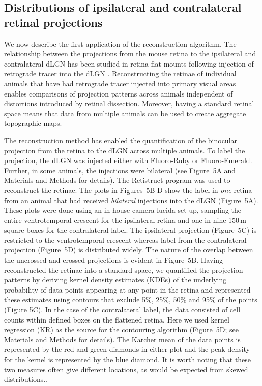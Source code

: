 \documentclass[10pt]{article}
\newcounter{Figure}
\begin{document}
\subsection*{Distributions of ipsilateral and contralateral retinal
projections }
We now describe the first application of the reconstruction algorithm.
The relationship between the projections from the mouse retina to the
ipsilateral and contralateral dLGN has been studied in retina
flat-mounts following injection of retrograde tracer into the dLGN \cite{ColemanEtal2009}. Reconstructing the retinae of individual
animals that have had retrograde tracer injected into primary visual
areas enables comparisons of projection patterns across animals
independent of distortions introduced by retinal dissection.
Moreover, having a standard retinal space means that data from
multiple animals can be used to create aggregate topographic maps. 

The reconstruction method has enabled the quantification of the
binocular projection from the retina to the dLGN across multiple
animals. To label the projection, the dLGN was injected either with
Fluoro-Ruby or Fluoro-Emerald. Further, in some animals, the
injections were bilateral (see Figure~5A and Materials and Methods
for details). The Retistruct program was used to reconstruct the
retinae. The plots in Figures~5B-D show the label in \textit{one}
retina from an animal that had received \textit{bilateral} injections
into the dLGN (Figure~5A). These plots were done using an in-house
camera-lucida set-up, sampling the entire ventrotemporal crescent for
the ipsilateral retina and one in nine 150\,{\textmu}m square boxes
for the contralateral label. The ipsilateral projection (Figure~5C)
is restricted to the ventrotemporal crescent whereas label from the
contralateral projection (Figure~5D) is distributed widely. The
nature of the overlap between the uncrossed and crossed projections
is evident in Figure~5B. Having reconstructed the retinae into a
standard space, we quantified the projection patterns by deriving
kernel density estimates (KDEs) of the underlying probability of data
points appearing at any point in the retina and represented these
estimates using contours that exclude 5\%, 25\%, 50\% and 95\% of the
points (Figure 5C). In the case of the contralateral label, the data
consisted of cell counts within defined boxes on the flattened
retina. Here we used kernel regression (KR) as the source for the
contouring algorithm (Figure~5D; see Materials and Methods for
details). The Karcher mean of the data points is represented by the
red and green diamonds in either plot and the peak density for the
kernel is represented by the blue diamond. It is worth noting that
these two measures often give different locations, as would be
expected from skewed distributions..  
\end{document}
